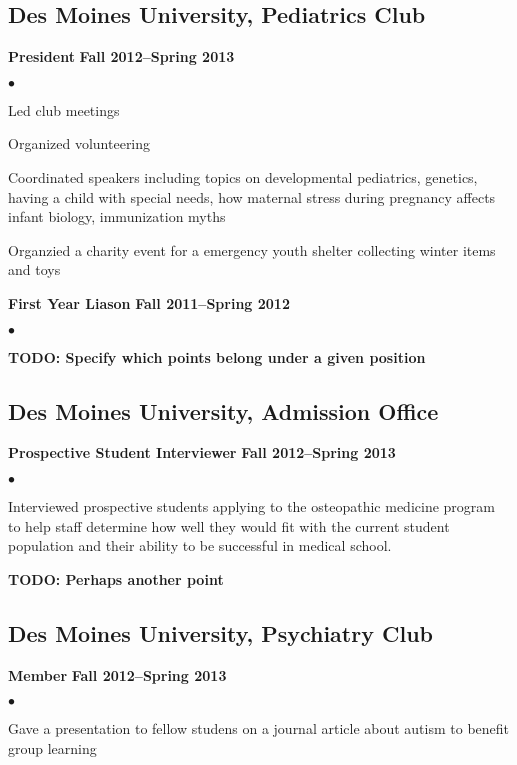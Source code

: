 \documentclass[10pt,letterpaper]{article}
\renewenvironment{itemize}{
  \begin{list}{}{
      \setlength{\leftmargin}{1.5em}
      \setlength{\itemsep}{0.25em}
      \setlength{\parskip}{0pt}
      \setlength{\parsep}{0.25em}
    }
  }{
  \end{list}
}
\newenvironment{bitemize}{
  \begin{list}{$\bullet$}{
      \setlength{\leftmargin}{1.5em}
      \setlength{\itemsep}{0.25em}
      \setlength{\parskip}{0pt}
      \setlength{\parsep}{0.25em}
    }
  }{
  \end{list}
}
\newcommand{\yearrange}[1]{\hfill \textbf{#1} \par}
\begin{document}
\subsection*{Des Moines University, Pediatrics Club}
\begin{itemize}
\item \textbf{President} \yearrange{Fall 2012--Spring 2013}
  \begin{bitemize}
  \item Led club meetings
  \item Organized volunteering 
  \item Coordinated speakers including topics on developmental
    pediatrics, genetics, having a child with special needs, how
    maternal stress during pregnancy affects infant biology,
    immunization myths
  \item Organzied a charity event for a emergency youth shelter
    collecting winter items and toys
  \end{bitemize}
\item \textbf{First Year Liason} \yearrange{Fall 2011--Spring 2012}
  \begin{bitemize}
  \item \textbf{TODO: Specify which points belong under a given position}
  \end{bitemize}
\end{itemize}

\subsection*{Des Moines University, Admission Office}
\begin{itemize}
\item \textbf{Prospective Student Interviewer} \yearrange{Fall 2012--Spring 2013}
  \begin{bitemize}
  \item Interviewed prospective students applying to the osteopathic
    medicine program to help staff determine how well they would fit
    with the current student population and their ability to be
    successful in medical school.
  \item \textbf{TODO: Perhaps another point}
  \end{bitemize}
\end{itemize}

\subsection*{Des Moines University, Psychiatry Club}
\begin{itemize}
\item \textbf{Member} \yearrange{Fall 2012--Spring 2013}
  \begin{bitemize}
  \item Gave a presentation to fellow studens on a journal article about autism to benefit group learning
   \end{bitemize}
\end{itemize}
\end{document}
